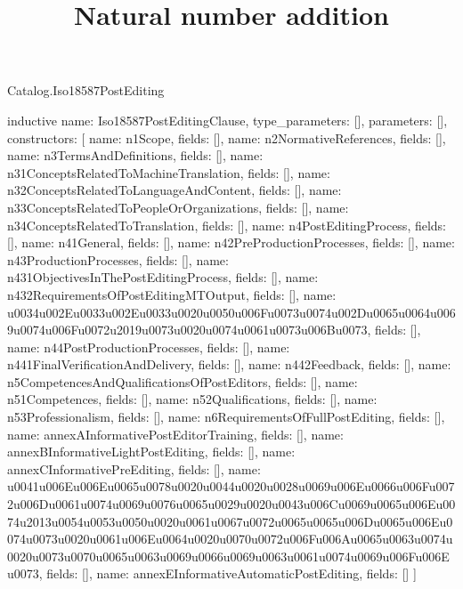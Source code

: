 \begin{lexlean}{Catalog.Iso18587PostEditing}
\title{Natural number addition}
\begin{semanticmodule}
inductive{
  name: Iso18587PostEditingClause,
  type_parameters: [],
  parameters: [],
  constructors: [
    {name: n1Scope, fields: []},
    {name: n2NormativeReferences, fields: []},
    {name: n3TermsAndDefinitions, fields: []},
    {name: n31ConceptsRelatedToMachineTranslation, fields: []},
    {name: n32ConceptsRelatedToLanguageAndContent, fields: []},
    {name: n33ConceptsRelatedToPeopleOrOrganizations, fields: []},
    {name: n34ConceptsRelatedToTranslation, fields: []},
    {name: n4PostEditingProcess, fields: []},
    {name: n41General, fields: []},
    {name: n42PreProductionProcesses, fields: []},
    {name: n43ProductionProcesses, fields: []},
    {name: n431ObjectivesInThePostEditingProcess, fields: []},
    {name: n432RequirementsOfPostEditingMTOutput, fields: []},
    {name: u0034u002Eu0033u002Eu0033u0020u0050u006Fu0073u0074u002Du0065u0064u0069u0074u006Fu0072u2019u0073u0020u0074u0061u0073u006Bu0073, fields: []},
    {name: n44PostProductionProcesses, fields: []},
    {name: n441FinalVerificationAndDelivery, fields: []},
    {name: n442Feedback, fields: []},
    {name: n5CompetencesAndQualificationsOfPostEditors, fields: []},
    {name: n51Competences, fields: []},
    {name: n52Qualifications, fields: []},
    {name: n53Professionalism, fields: []},
    {name: n6RequirementsOfFullPostEditing, fields: []},
    {name: annexAInformativePostEditorTraining, fields: []},
    {name: annexBInformativeLightPostEditing, fields: []},
    {name: annexCInformativePreEditing, fields: []},
    {name: u0041u006Eu006Eu0065u0078u0020u0044u0020u0028u0069u006Eu0066u006Fu0072u006Du0061u0074u0069u0076u0065u0029u0020u0043u006Cu0069u0065u006Eu0074u2013u0054u0053u0050u0020u0061u0067u0072u0065u0065u006Du0065u006Eu0074u0073u0020u0061u006Eu0064u0020u0070u0072u006Fu006Au0065u0063u0074u0020u0073u0070u0065u0063u0069u0066u0069u0063u0061u0074u0069u006Fu006Eu0073, fields: []},
    {name: annexEInformativeAutomaticPostEditing, fields: []}
  ]
}


\end{semanticmodule}
\end{lexlean}

